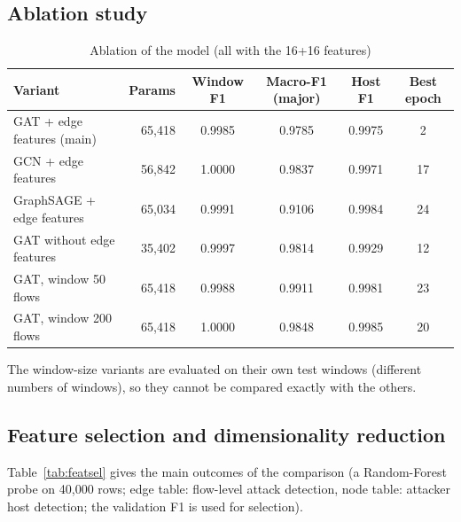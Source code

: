 \subsection{Ablation study}

\begin{table}[htbp]
\centering
\caption{Ablation of the model (all with the 16+16 features)}
\label{tab:ablation}
\small
\begin{tabular}{|l|r|c|c|c|c|}
\hline
\textbf{Variant} & \textbf{Params} & \textbf{Window F1} & \textbf{Macro-F1 (major)} & \textbf{Host F1} & \textbf{Best epoch} \\ \hline
GAT + edge features (main) & 65,418 & 0.9985 & 0.9785 & 0.9975 & 2 \\ \hline
GCN + edge features & 56,842 & 1.0000 & 0.9837 & 0.9971 & 17 \\ \hline
GraphSAGE + edge features & 65,034 & 0.9991 & 0.9106 & 0.9984 & 24 \\ \hline
GAT without edge features & 35,402 & 0.9997 & 0.9814 & 0.9929 & 12 \\ \hline
GAT, window 50 flows & 65,418 & 0.9988 & 0.9911 & 0.9981 & 23 \\ \hline
GAT, window 200 flows & 65,418 & 1.0000 & 0.9848 & 0.9985 & 20 \\ \hline
\end{tabular}
\end{table}

The window-size variants are evaluated on their own test windows (different numbers of windows), so they cannot be compared exactly with the others.

\subsection{Feature selection and dimensionality reduction}

Table~\ref{tab:featsel} gives the main outcomes of the comparison (a Random-Forest probe on 40,000 rows; edge table: flow-level attack detection, node table: attacker host detection; the validation F1 is used for selection).

